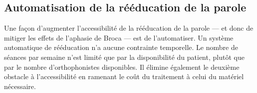 \subsection{Automatisation de la rééducation de la parole}

Une façon d'augmenter l'accessibilité de la rééducation de la parole 
--- et donc de mitiger les effets de l'aphasie de Broca ---
est de l'automatiser.
Un système automatique de rééducation n'a aucune contrainte temporelle.
Le nombre de séances par semaine n'est limité que par la disponibilité du patient,
plutôt que par le nombre d'orthophonistes disponibles.
Il élimine également le deuxième obstacle à l'accessibilité
en ramenant le coût du traitement à celui du matériel nécessaire.